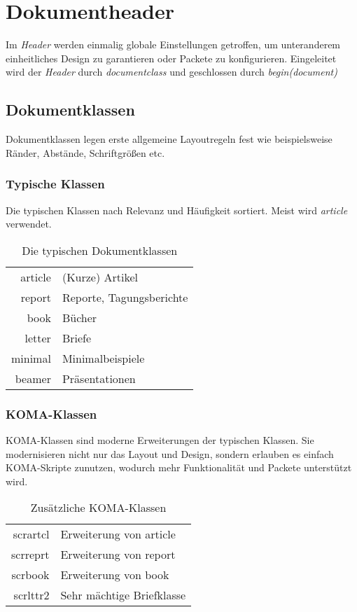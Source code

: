 \section{Dokumentheader}
Im \textit{Header} werden einmalig globale Einstellungen getroffen, um unteranderem einheitliches Design zu garantieren oder Packete zu konfigurieren.
Eingeleitet wird der \textit{Header} durch \textit{documentclass} und geschlossen durch \textit{begin(document)}

\subsection{Dokumentklassen}
Dokumentklassen legen erste allgemeine Layoutregeln fest wie beispielsweise Ränder, Abstände, Schriftgrößen etc.
\subsubsection{Typische Klassen}
Die typischen Klassen nach Relevanz und Häufigkeit sortiert. Meist wird \textit{article} verwendet.
\begin{table}[h]
    \centering
    \begin{tabular}{rl}
        article & (Kurze) Artikel          \\
        report  & Reporte, Tagungsberichte \\
        book    & Bücher                   \\
        letter  & Briefe                   \\
        minimal & Minimalbeispiele         \\
        beamer  & Präsentationen
    \end{tabular}
    \caption{Die typischen Dokumentklassen}
    \label{typischeDokumentKlassen}
\end{table}

\subsubsection{KOMA-Klassen}
KOMA-Klassen sind moderne Erweiterungen der typischen Klassen. Sie modernisieren nicht nur das Layout und Design, sondern erlauben es einfach KOMA-Skripte zunutzen, wodurch mehr Funktionalität und Packete unterstützt wird.

\begin{table}[h]
    \centering
    \begin{tabular}{rl}
        scrartcl & Erweiterung von article   \\
        scrreprt & Erweiterung von report    \\
        scrbook  & Erweiterung von book      \\
        scrlttr2 & Sehr mächtige Briefklasse
    \end{tabular}
    \caption{Zusätzliche KOMA-Klassen}
    \label{KOMAKlassen}
\end{table}

